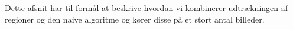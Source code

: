 {
{\sffamily Dette afsnit har til formål at beskrive hvordan vi kombinerer
udtrækningen af regioner og den naive algoritme og kører disse på et
stort antal billeder.
}


}


